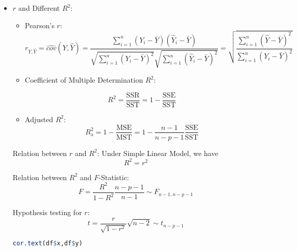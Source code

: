 \begin{itemize}[topsep=2pt,itemsep=2pt]
\item $ r $ and Different $ R^2 $:
\begin{itemize}[topsep=2pt,itemsep=0pt]
    \item Pearson's $ r $:
    \begin{equation}
        r_{Y,\hat{Y}}=\hat{cov}(Y,\hat{Y})=\dfrac{\sum\limits_{i=1}^n(Y_i-\bar{Y})(\hat{Y}_i-\bar{Y})}{\sqrt{\sum\limits_{i=1}^n(Y_i-\bar{Y})^2}\sqrt{\sum\limits_{i=1}^n(\hat{Y}_i-\bar{Y})^2}}=\sqrt{\dfrac{\sum\limits_{i=1}^n(\hat{Y}-\bar{Y})^2}{\sum\limits_{i=1}^n(Y_i-\bar{Y})^2}}
    \end{equation}
    \item Coefficient of Multiple Determination $ R^2 $:

    \begin{equation}
        R^2=\dfrac{\mathrm{SSR}}{\mathrm{SST}}=1-\dfrac{\mathrm{SSE}}{\mathrm{SST}}
    \end{equation}
    \item Adjusted $ R^2 $:
    \begin{equation}
        R^2_\mathrm{a}=1-\dfrac{\mathrm{MSE}}{\mathrm{MST}} =1-\dfrac{n-1}{n-p-1}\dfrac{\mathrm{SSE}}{\mathrm{SST}}
    \end{equation}
\end{itemize}

    Relation between $ r $ and $ R^2 $: Under Simple Linear Model, we have 
        \begin{equation}
            R^2=r^2 
        \end{equation}
    
    Relation between $ R^2 $ and $ F $-Statistic:
        \begin{equation}
            F=\dfrac{R^2}{1-R^2}\dfrac{n-p-1}{n-1} \sim F_{n-1,n-p-1}
        \end{equation}

    Hypothesis testing for $ r $: 
    \begin{equation}
        t=\dfrac{r}{\sqrt{1-r^2}}\sqrt{n-2}\sim t_{n-p-1} 
    \end{equation}

\begin{rcode}
\begin{lstlisting}[language=R]
cor.text(df$x,df$y)
\end{lstlisting}
\end{rcode}
    



\end{itemize}
